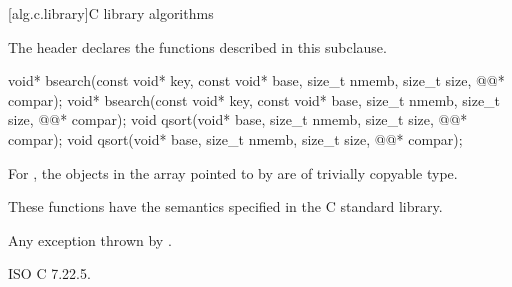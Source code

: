 [alg.c.library]{C library algorithms}

\pnum
\begin{note}
The header 
declares the functions described in this subclause.
\end{note}

%
%
\begin{itemdecl}
void* bsearch(const void* key, const void* base, size_t nmemb, size_t size,
              @@* compar);
void* bsearch(const void* key, const void* base, size_t nmemb, size_t size,
              @@* compar);
void qsort(void* base, size_t nmemb, size_t size, @@* compar);
void qsort(void* base, size_t nmemb, size_t size, @@* compar);
\end{itemdecl}

\begin{itemdescr}
\pnum
\expects
For , the objects in the array pointed to by 
are of trivially copyable type.

\pnum
\effects
These functions have the semantics specified in the C standard library.

\pnum
\throws
Any exception thrown by .
\end{itemdescr}

\xref
ISO C 7.22.5.
